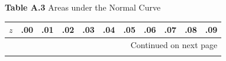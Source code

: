 \documentclass[12pt,a4paper]{article}
\begin{document}
\begin{enumerate}
\begin{center}
\end{center}

\vspace{0.3cm}
\noindent\textbf{Table A.3} Areas under the Normal Curve
\vspace{0.2cm}

\begin{center}
\small
\begin{longtable}{ccccccccccc}
\toprule\toprule
$z$ & .00 & .01 & .02 & .03 & .04 & .05 & .06 & .07 & .08 & .09 \\
\midrule
\endhead %

\midrule
\multicolumn{11}{r}{{Continued on next page}} \\
\bottomrule
\endfoot

\bottomrule\bottomrule
\endlastfoot


\end{longtable}
\end{center}
\end{enumerate}
\end{document}
